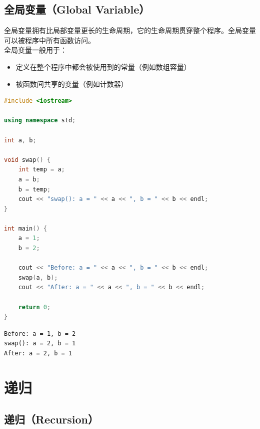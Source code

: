 \vspace{0.5cm}

\subsection{全局变量（Global Variable）}

全局变量拥有比局部变量更长的生命周期，它的生命周期贯穿整个程序。全局变量可以被程序中所有函数访问。\\

全局变量一般用于：

\begin{itemize}
	\item 定义在整个程序中都会被使用到的常量（例如数组容量）
	\item 被函数间共享的变量（例如计数器）
\end{itemize}

\vspace{0.5cm}


\begin{lstlisting}[language=C++]
#include <iostream>

using namespace std;

int a, b;

void swap() {
	int temp = a;
	a = b;
	b = temp;
	cout << "swap(): a = " << a << ", b = " << b << endl;
}

int main() {
	a = 1;
	b = 2;

	cout << "Before: a = " << a << ", b = " << b << endl;
	swap(a, b);
	cout << "After: a = " << a << ", b = " << b << endl;

	return 0;
}
\end{lstlisting}

\begin{tcolorbox}
	\begin{verbatim}
Before: a = 1, b = 2
swap(): a = 2, b = 1
After: a = 2, b = 1
	\end{verbatim}
\end{tcolorbox}

\newpage

\section{递归} \label{recursion}

\subsection{递归（Recursion）}

